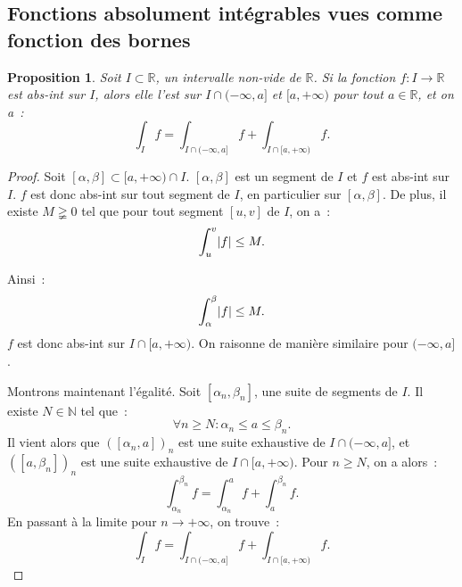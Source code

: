 \documentclass{report}
\newtheorem{prp}[thm]{Proposition}
\theoremstyle{definition}
\theoremstyle{remark}
\numberwithin{equation}{section}
\newcommand{\R}{\mathbb R}
\newcommand{\N}{\mathbb N}
\newcommand{\minfty}{{-\infty}}
\newcommand{\pinfty}{{+\infty}}
\begin{document}
		\subsection{Fonctions absolument intégrables vues comme fonction des bornes}
			\begin{prp} Soit $I \subset \R$, un intervalle non-vide de $\R$. Si la fonction $f : I \to \R$ est abs-int sur $I$, alors elle l'est sur
			$I \cap (\minfty, a]$ et $[a, \pinfty)$ pour tout $a \in \R$, et on a~:
			\begin{equation}
				\int_I f = \int_{I \cap (\minfty, a]} f + \int_{I \cap [a, \pinfty)} f.
			\end{equation}
			\end{prp}

			\begin{proof} Soit $[\alpha, \beta] \subset [a, \pinfty) \cap I$. $[\alpha, \beta]$ est un segment de $I$ et $f$ est abs-int sur $I$. $f$ est donc abs-int
			sur tout segment de $I$, en particulier sur $[\alpha, \beta]$. De plus, il existe $M \gneqq 0$ tel que pour tout segment $[u, v]$ de $I$, on a~:
			\begin{equation}
				\int_u^v \abs f \leq M.
			\end{equation}

			Ainsi~:
			\begin{equation}
				\int_\alpha^\beta \abs f \leq M.
			\end{equation}
			$f$ est donc abs-int sur $I \cap [a, \pinfty)$. On raisonne de manière similaire pour $(\minfty, a]$.

			Montrons maintenant l'égalité. Soit $[\alpha_n, \beta_n]$, une suite de segments de $I$. Il existe $N \in \N$ tel que~:
			\begin{equation}
				\forall n \geq N : \alpha_n \leq a \leq \beta_n.
			\end{equation}
			Il vient alors que $([\alpha_n, a])_n$ est une suite exhaustive de $I \cap (\minfty, a]$, et $([a, \beta_n])_n$ est une suite exhaustive de
			$I \cap [a, \pinfty)$. Pour $n \geq N$, on a alors~:
			\begin{equation}
				\int_{\alpha_n}^{\beta_n} f = \int_{\alpha_n}^a f + \int_a^{\beta_n} f.
			\end{equation}
			En passant à la limite pour $n \to \pinfty$, on trouve~:
			\begin{equation}
				\int_I f= \int_{I \cap (\minfty, a]} f + \int_{I \cap [a, \pinfty)} f.
			\end{equation}
			\end{proof}
\end{document}
